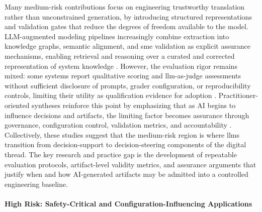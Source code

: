 Many medium-risk contributions focus on engineering trustworthy translation rather than unconstrained generation, by introducing structured representations and validation gates that reduce the degrees of freedom available to the model. LLM-augmented modeling pipelines increasingly combine extraction into knowledge graphs, semantic alignment, and \ac{sme} validation as explicit assurance mechanisms, enabling retrieval and reasoning over a curated and corrected representation of system knowledge \cite{Lipizzi_LLM_Augmented_Pipelines_Validated_System_Model_Creation_2025, garciaalarcia_BringingSystemsEngineering_2024}. However, the evaluation rigor remains mixed: some systems report qualitative scoring and \ac{llm}-as-judge assessments without sufficient disclosure of prompts, grader configuration, or reproducibility controls, limiting their utility as qualification evidence for adoption \cite{Collard_Automated_Knowledge_Base_Generation_Open_Source_LLMs_RAG_2025}. Practitioner-oriented syntheses reinforce this point by emphasizing that as AI begins to influence decisions and artifacts, the limiting factor becomes assurance through governance, configuration control, validation metrics, and accountability \cite{Lee_CastilloEffen_2024_Rapid_Intelligent_Systems_Engineering, sheard_AIOverviewCaveats_2025}. Collectively, these studies suggest that the medium-risk region is where \acp{llm} transition from decision-support to decision-steering components of the digital thread. The key research and practice gap is the development of repeatable evaluation protocols, artifact-level validity metrics, and assurance arguments that justify when and how AI-generated artifacts may be admitted into a controlled engineering baseline.


\paragraph{High Risk: Safety-Critical and Configuration-Influencing Applications }

